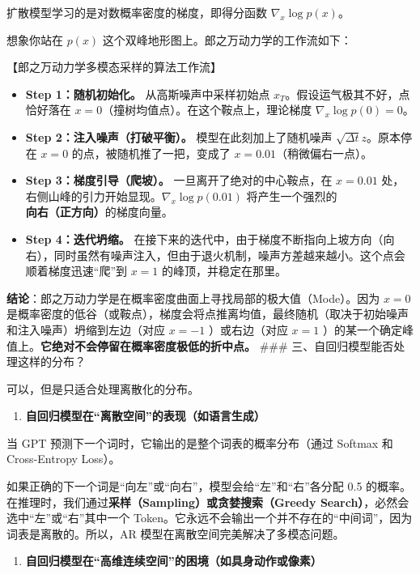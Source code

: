 扩散模型学习的是对数概率密度的梯度，即得分函数 \(\nabla_x\log p(x)\)。

想象你站在 \(p(x)\) 这个双峰地形图上。郎之万动力学的工作流如下：

【郎之万动力学多模态采样的算法工作流】

\begin{itemize}
\tightlist
\item
  \textbf{Step 1：随机初始化。} 从高斯噪声中采样初始点 \(x_T\)。假设运气极其不好，点恰好落在 \(x=0\)（撞树均值点）。在这个鞍点上，理论梯度 \(\nabla_x\log p(0)=0\)。
\item
  \textbf{Step 2：注入噪声（打破平衡）。} 模型在此刻加上了随机噪声 \(\sqrt{\Delta t}z\)。原本停在 \(x=0\) 的点，被随机推了一把，变成了 \(x=0.01\)（稍微偏右一点）。
\item
  \textbf{Step 3：梯度引导（爬坡）。} 一旦离开了绝对的中心鞍点，在 \(x=0.01\) 处，右侧山峰的引力开始显现。\(\nabla_x\log p(0.01)\) 将产生一个强烈的\textbf{向右（正方向）}的梯度向量。
\item
  \textbf{Step 4：迭代坍缩。} 在接下来的迭代中，由于梯度不断指向上坡方向（向右），同时虽然有噪声注入，但由于退火机制，噪声方差越来越小。这个点会顺着梯度迅速``爬''到 \(x=1\) 的峰顶，并稳定在那里。
\end{itemize}

\textbf{结论}：郎之万动力学是在概率密度曲面上寻找局部的极大值（Mode）。因为 \(x=0\) 是概率密度的低谷（或鞍点），梯度会将点推离均值，最终随机（取决于初始噪声和注入噪声）坍缩到左边（对应 \(x=-1\) ）或右边（对应 \(x=1\) ）的某一个确定峰值上。\textbf{它绝对不会停留在概率密度极低的折中点。}
\#\#\# 三、自回归模型能否处理这样的分布？

可以，但是只适合处理离散化的分布。

\begin{enumerate}
\def\labelenumi{\arabic{enumi}.}
\tightlist
\item
  \textbf{自回归模型在``离散空间''的表现（如语言生成）}
\end{enumerate}

当 GPT 预测下一个词时，它输出的是整个词表的概率分布（通过 Softmax 和 Cross-Entropy Loss）。

如果正确的下一个词是``向左''或``向右''，模型会给``左''和``右''各分配 0.5 的概率。在推理时，我们通过\textbf{采样（Sampling）或贪婪搜索（Greedy Search）}，必然会选中``左''或``右''其中一个 Token。它永远不会输出一个并不存在的``中间词''，因为词表是离散的。所以，AR 模型在离散空间完美解决了多模态问题。

\begin{enumerate}
\def\labelenumi{\arabic{enumi}.}
\setcounter{enumi}{1}
\tightlist
\item
  \textbf{自回归模型在``高维连续空间''的困境（如具身动作或像素）}
\end{enumerate}

